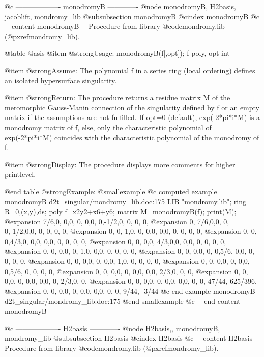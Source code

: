 @c ------------------- monodromyB -------------
@node monodromyB, H2basis, jacoblift, mondromy_lib
@subsubsection monodromyB
@cindex monodromyB
@c ---content monodromyB---
Procedure from library @code{mondromy.lib} (@pxref{mondromy_lib}).

@table @asis
@item @strong{Usage:}
monodromyB(f[,opt]); f poly, opt int

@item @strong{Assume:}
The polynomial f in a series ring (local ordering) defines
an isolated hypersurface singularity.

@item @strong{Return:}
The procedure returns a residue matrix M of the meromorphic
Gauss-Manin connection of the singularity defined by f
or an empty matrix if the assumptions are not fulfilled.
If opt=0 (default), exp(-2*pi*i*M) is a monodromy matrix of f,
else, only the characteristic polynomial of exp(-2*pi*i*M) coincides
with the characteristic polynomial of the monodromy of f.

@item @strong{Display:}
The procedure displays more comments for higher printlevel.

@end table
@strong{Example:}
@smallexample
@c computed example monodromyB d2t_singular/mondromy_lib.doc:175 
LIB "mondromy.lib";
ring R=0,(x,y),ds;
poly f=x2y2+x6+y6;
matrix M=monodromyB(f);
print(M);
@expansion{} 7/6,0,  0,0,  0,  0,0,   0,-1/2,0,  0,  0,    0,       
@expansion{} 0,  7/6,0,0,  0,  0,-1/2,0,0,   0,  0,  0,    0,       
@expansion{} 0,  0,  1,0,  0,  0,0,   0,0,   0,  0,  0,    0,       
@expansion{} 0,  0,  0,4/3,0,  0,0,   0,0,   0,  0,  0,    0,       
@expansion{} 0,  0,  0,0,  4/3,0,0,   0,0,   0,  0,  0,    0,       
@expansion{} 0,  0,  0,0,  0,  1,0,   0,0,   0,  0,  0,    0,       
@expansion{} 0,  0,  0,0,  0,  0,5/6, 0,0,   0,  0,  0,    0,       
@expansion{} 0,  0,  0,0,  0,  0,0,   1,0,   0,  0,  0,    0,       
@expansion{} 0,  0,  0,0,  0,  0,0,   0,5/6, 0,  0,  0,    0,       
@expansion{} 0,  0,  0,0,  0,  0,0,   0,0,   2/3,0,  0,    0,       
@expansion{} 0,  0,  0,0,  0,  0,0,   0,0,   0,  2/3,0,    0,       
@expansion{} 0,  0,  0,0,  0,  0,0,   0,0,   0,  0,  47/44,-625/396,
@expansion{} 0,  0,  0,0,  0,  0,0,   0,0,   0,  0,  9/44, -3/44    
@c end example monodromyB d2t_singular/mondromy_lib.doc:175
@end smallexample
@c ---end content monodromyB---

@c ------------------- H2basis -------------
@node H2basis,, monodromyB, mondromy_lib
@subsubsection H2basis
@cindex H2basis
@c ---content H2basis---
Procedure from library @code{mondromy.lib} (@pxref{mondromy_lib}).

